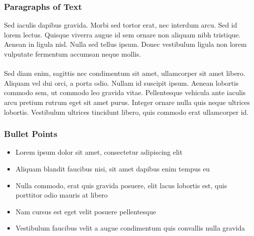\documentclass[aspectratio=169]{beamer}
\begin{document}
\begin{frame}
\frametitle{Paragraphs of Text}
Sed iaculis dapibus gravida. Morbi sed tortor erat, nec interdum arcu. Sed id lorem lectus. Quisque viverra augue id sem ornare non aliquam nibh tristique. Aenean in ligula nisl. Nulla sed tellus ipsum. Donec vestibulum ligula non lorem vulputate fermentum accumsan neque mollis.\\~\\

Sed diam enim, sagittis nec condimentum sit amet, ullamcorper sit amet libero. Aliquam vel dui orci, a porta odio. Nullam id suscipit ipsum. Aenean lobortis commodo sem, ut commodo leo gravida vitae. Pellentesque vehicula ante iaculis arcu pretium rutrum eget sit amet purus. Integer ornare nulla quis neque ultrices lobortis. Vestibulum ultrices tincidunt libero, quis commodo erat ullamcorper id.
\end{frame}


\begin{frame}
\frametitle{Bullet Points}
\begin{itemize}
\item Lorem ipsum dolor sit amet, consectetur adipiscing elit
\item Aliquam blandit faucibus nisi, sit amet dapibus enim tempus eu
\item Nulla commodo, erat quis gravida posuere, elit lacus lobortis est, quis porttitor odio mauris at libero
\item Nam cursus est eget velit posuere pellentesque
\item Vestibulum faucibus velit a augue condimentum quis convallis nulla gravida
\end{itemize}
\end{frame}
\end{document}

